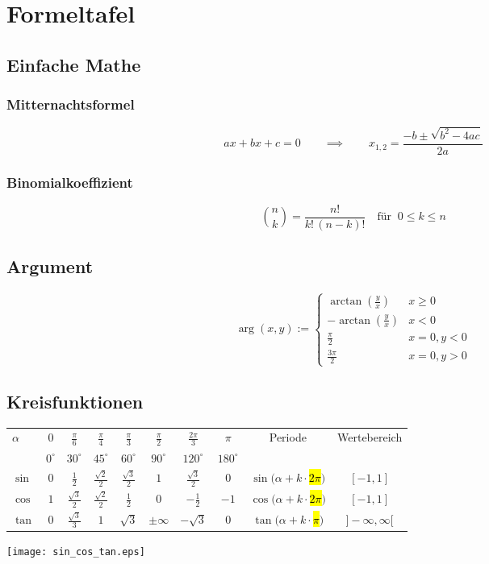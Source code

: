 \section{Formeltafel}
\subsection{Einfache Mathe}
	\subsubsection{Mitternachtsformel}
	\[ a x + b x + c = 0 \qquad \implies \qquad x_{1,2} = \frac{-b \pm \sqrt{b^2-4ac}}{2a} \]
	\subsubsection{Binomialkoeffizient}
	\[ \binom nk = \frac{n!}{k!\,(n-k)!} \quad \mbox{für }\ 0\leq k\leq n \]
\subsection{Argument}
\[
	\arg(x,y) := \begin{cases}
		\arctan(\frac{y}{x}) & x \geq 0 \\
		-\arctan(\frac{y}{x}) & x < 0 \\
		\frac{\pi}{2} & x=0, y < 0 \\
		\frac{3\pi}{2} & x = 0, y > 0
	\end{cases}
\]

\subsection{Kreisfunktionen}
{\footnotesize
\begin{tabular}{|l||c|c|c|c|c|c|c||c|c|}\hline
\multirow{2}{*}{$\alpha$} & $0$ & $\frac{\pi}{6}$ & $\frac{\pi}{4}$ &
$\frac{\pi}{3}$ & $\frac{\pi}{2}$ & $\frac{2\pi}{3}$ & $\pi$ &
\multirow{2}{*}{Periode} & \multirow{2}{*}{Wertebereich}\\

& $0^\circ$ & $30^\circ$ & $45^\circ$ & $60^\circ$ & $90^\circ$ & $120^\circ$ &
$180^\circ$ & &\\ \hline

$\sin$ & $0$ & $\frac{1}{2}$ & $\frac{\sqrt{2}}{2}$ &
$\frac{\sqrt{3}}{2}$ & $1$ & $\frac{\sqrt{3}}{2}$ & $0$ & $\sin(\alpha +
k\cdot$\hl{$2\pi$}$)$ & $[-1,1]$\\ \hline

$\cos$ & $1$ & $\frac{\sqrt{3}}{2}$ & $\frac{\sqrt{2}}{2}$ & $\frac{1}{2}$ & $0$
& $-\frac{1}{2}$ & $-1$ & $\cos(\alpha + k\cdot$\hl{$2\pi$}$)$ & $[-1,1]$\\
\hline


$\tan$ & $0$ & $\frac{\sqrt{3}}{3}$ & $1$ & $\sqrt{3}$ & $\pm \infty$ &
$-\sqrt{3}$ & $0$ & $\tan(\alpha + k \cdot$\hl{$\pi$}$)$ & $]-\infty, \infty[$
\\
\hline
\end{tabular}
}
\texttt{[image: sin\_cos\_tan.eps]}

